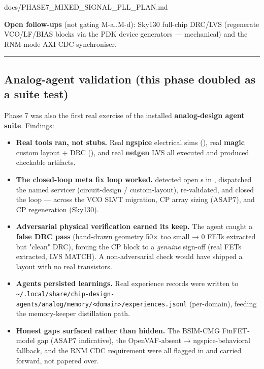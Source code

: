 \begin{relocated}{docs/PHASE7_MIXED_SIGNAL_PLL_PLAN.md}
{}

\textbf{Open follow-ups} (not gating M-a..M-d): Sky130 full-chip DRC/LVS
(regenerate VCO/\allowbreak{}LF/\allowbreak{}BIAS blocks via the PDK
device generators --- mechanical) and the RNM-mode AXI CDC synchroniser.

\begin{center}\rule{0.5\linewidth}{0.5pt}\end{center}

\subsection{Analog-agent validation (this phase doubled as a suite
test)}\label{ds:ch:phase7-pll-plan:8-analog-agent-validation-this-phase-doubled-as-a-suite-test}

Phase 7 was also the first real exercise of the installed
\textbf{analog-design agent suite}. Findings:

\begin{itemize}
\tightlist
\item
  \textbf{Real tools ran, not stubs.} Real \textbf{ngspice} electrical
  sims (), real \textbf{magic} custom layout + DRC
  (), and real \textbf{netgen} LVS all executed and
  produced checkable artifacts.
\item
  \textbf{The closed-loop meta fix loop worked.}
   detected open s in
  , dispatched the named servicer (circuit-design
  / custom-layout), re-validated, and closed the loop --- across the VCO
  SLVT migration, CP array sizing (ASAP7), and CP regeneration (Sky130).
\item
  \textbf{Adversarial physical verification earned its keep.} The
   agent caught a \textbf{false DRC pass}
  (hand-drawn geometry 50× too small → 0 FETs extracted but "clean"
  DRC), forcing the CP block to a \emph{genuine} sign-off (real FETs
  extracted, LVS MATCH). A non-adversarial check would have shipped a
  layout with no real transistors.
\item
  \textbf{Agents persisted learnings.} Real experience records were
  written to
  \texttt{\textasciitilde{}/\allowbreak{}.\allowbreak{}local/\allowbreak{}share/\allowbreak{}chip-\allowbreak{}design-\allowbreak{}agents/\allowbreak{}analog/\allowbreak{}memory/\allowbreak{}<domain>/\allowbreak{}experiences.\allowbreak{}jsonl}
  (per-domain), feeding the memory-keeper distillation path.
\item
  \textbf{Honest gaps surfaced rather than hidden.} The BSIM-CMG
  FinFET-model gap (ASAP7 indicative), the OpenVAF-absent →
  ngspice-behavioral fallback, and the RNM CDC requirement were all
  flagged in  and carried forward, not papered
  over.
\end{itemize}


\end{relocated}
